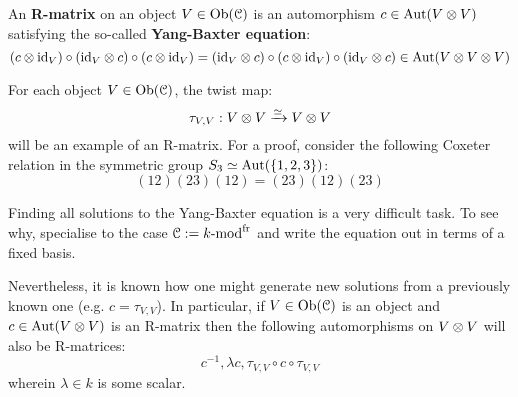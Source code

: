             \begin{definition}[R-matrices] \label{def: R_matrices}
                An \textbf{R-matrix} on an object $V \in \mathrm{Ob}(\mathcal{C})$ is an automorphism $c \in \Aut(V \tensor V)$ satisfying the so-called \textbf{Yang-Baxter equation}:
                    $$(c \tensor \id_V) \circ (\id_V \tensor c) \circ (c \tensor \id_V) = (\id_V \tensor c) \circ (c \tensor \id_V) \circ (\id_V \tensor c) \in \Aut(V \tensor V \tensor V)$$
            \end{definition}
            \begin{example}
                For each object $V \in \mathrm{Ob}(\mathcal{C})$, the twist map:
                    $$\tau_{V, V}: V \tensor V \xrightarrow[]{\cong} V \tensor V$$
                will be an example of an R-matrix. For a proof, consider the following Coxeter relation in the symmetric group $S_3 \simeq \mathrm{Aut}(\{1, 2, 3\})$:
                    $$(12)(23)(12) = (23)(12)(23)$$    
            \end{example}
            \begin{remark}
                Finding all solutions to the Yang-Baxter equation is a very difficult task. To see why, specialise to the case $\mathcal{C} := k\text{-}\mathrm{mod}^{\mathrm{fr}}$ and write the equation out in terms of a fixed basis. 
                
                Nevertheless, it is known how one might generate new solutions from a previously known one (e.g. $c = \tau_{V, V}$). In particular, if $V \in \mathrm{Ob}(\mathcal{C})$ is an object and $c \in \Aut(V \tensor V)$ is an R-matrix then the following automorphisms on $V \tensor V$ will also be R-matrices:
                    $$c^{-1}, \lambda c, \tau_{V, V} \circ c \circ \tau_{V, V}$$
                wherein $\lambda \in k$ is some scalar.
            \end{remark}
